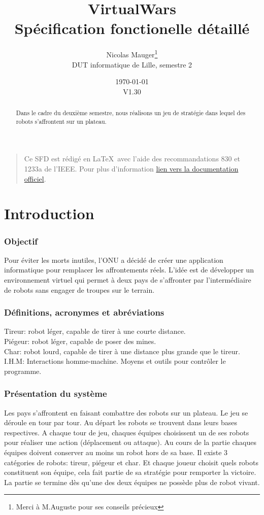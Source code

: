 \documentclass[12pt,a4paper]{article}
\title{VirtualWars \\Spécification fonctionelle détaillé}
\author{Nicolas Mauger\thanks{Merci à M.Auguste pour ses conseils précieux}
\\DUT informatique de Lille, semestre 2}
\date{\today \\V1.30}
\begin{document}
\maketitle \newpage

\tableofcontents \newpage

\begin{abstract}
Dans le cadre du deuxième semestre, nous réalisons un jeu de stratégie dans lequel des robots s'affrontent sur un plateau.
\end{abstract}

\begin{quotation}
Ce SFD est rédigé en \LaTeX\ avec l'aide des recommandations 830 et 1233a de l'IEEE. Pour plus d'information \href{http://www.math.uaa.alaska.edu/~afkjm/cs401/IEEE83.pdf}{lien vers la documentation  officiel}.
\end{quotation}

\part{Introduction}
		\section{Objectif}
Pour éviter les morts inutiles, l'ONU a décidé de créer une application informatique pour remplacer les affrontements réels. L'idée est de développer un environnement virtuel qui permet à deux pays de s'affronter par l'intermédiaire de robots sans engager de troupes sur le terrain.
		\section{Définitions, acronymes et abréviations}
			\noindent
			Tireur: robot léger, capable de tirer à une courte distance. \\
			Piégeur: robot léger, capable de poser des mines. \\
			Char: robot lourd, capable de tirer à une distance plus grande que le tireur. \\
			I.H.M: Interactions homme-machine. Moyens et outils pour contrôler le programme.	\\
			\indent
		\section{Présentation du système}
			Les pays s'affrontent en faisant combattre des robots sur un plateau.
Le jeu se déroule en tour par tour. Au départ les robots se trouvent dans leurs bases respectives.
A chaque tour de jeu, chaques équipes choisissent un de ses robots pour réaliser une action (déplacement ou attaque).
Au cours de la partie chaques équipes doivent conserver au moins un robot hors de sa base.
Il existe 3 catégories de robots: tireur, piégeur et char. Et chaque joueur choisit quels robots constituent son
équipe, cela fait partie de sa stratégie pour remporter la victoire.
La partie se termine dès qu'une des deux équipes ne possède plus de robot vivant.
\end{document}
